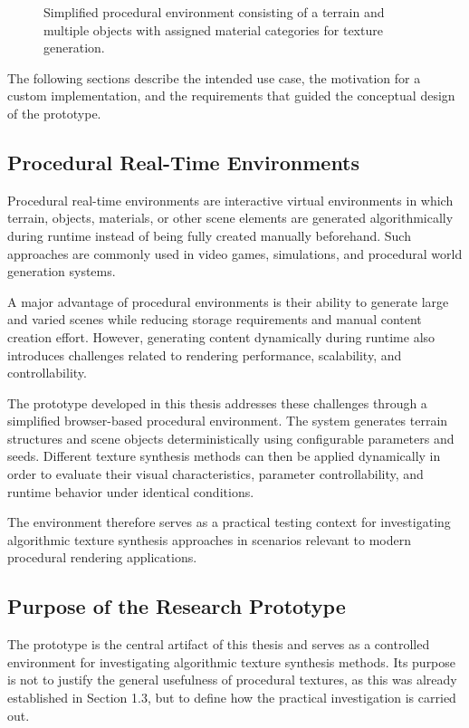 \begin{figure}[H]
    \centering
    {Simplified procedural environment consisting of a terrain and multiple objects with assigned material categories for texture generation.}
    \label{fig:proc_env_with_boxes}
\end{figure}

The following sections describe the intended use case, the motivation for a custom implementation, and the requirements that guided the conceptual design of the prototype.

\subsection{Procedural Real-Time Environments}

Procedural real-time environments are interactive virtual environments in which terrain, objects, materials, or other scene elements are generated algorithmically during runtime instead of being fully created manually beforehand. Such approaches are commonly used in video games, simulations, and procedural world generation systems.

A major advantage of procedural environments is their ability to generate large and varied scenes while reducing storage requirements and manual content creation effort. However, generating content dynamically during runtime also introduces challenges related to rendering performance, scalability, and controllability.

The prototype developed in this thesis addresses these challenges through a simplified browser-based procedural environment. The system generates terrain structures and scene objects deterministically using configurable parameters and seeds. Different texture synthesis methods can then be applied dynamically in order to evaluate their visual characteristics, parameter controllability, and runtime behavior under identical conditions.

The environment therefore serves as a practical testing context for investigating algorithmic texture synthesis approaches in scenarios relevant to modern procedural rendering applications.

\clearpage
\subsection{Purpose of the Research Prototype}

The prototype is the central artifact of this thesis and serves as a controlled environment for investigating algorithmic texture synthesis methods. Its purpose is not to justify the general usefulness of procedural textures, as this was already established in Section 1.3, but to define how the practical investigation is carried out.

